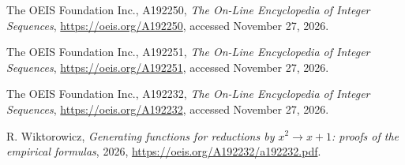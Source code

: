 The OEIS Foundation Inc., A192250,
\emph{The On-Line Encyclopedia of Integer Sequences},
\url{https://oeis.org/A192250}, accessed November 27, 2026.

The OEIS Foundation Inc., A192251,
\emph{The On-Line Encyclopedia of Integer Sequences},
\url{https://oeis.org/A192251}, accessed November 27, 2026.

The OEIS Foundation Inc., A192232,
\emph{The On-Line Encyclopedia of Integer Sequences},
\url{https://oeis.org/A192232}, accessed November 27, 2026.

R. Wiktorowicz,
\emph{Generating functions for reductions by $x^2\to x+1$: proofs of the empirical formulas},
2026, \url{https://oeis.org/A192232/a192232.pdf}.
